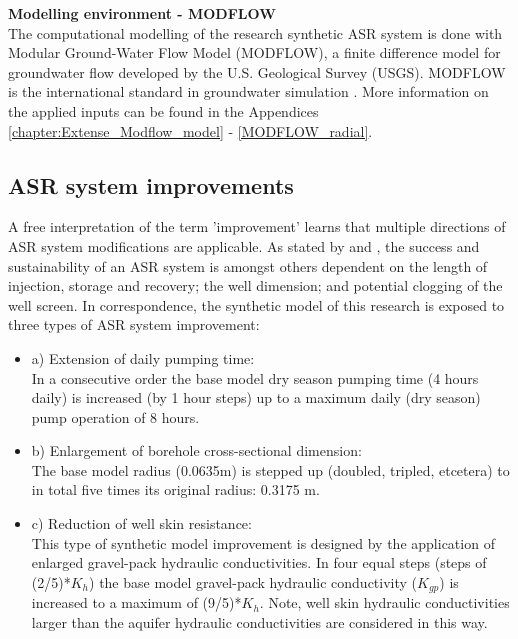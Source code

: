
\textbf{Modelling environment - MODFLOW} \\
The computational modelling of the research synthetic ASR system is done with Modular Ground-Water Flow Model (MODFLOW), a finite difference model for groundwater flow developed by the U.S. Geological Survey (USGS). MODFLOW is the international standard in groundwater simulation \citep{Niswonger2011,HarbaughArlen2005}. More information on the applied inputs can be found in the Appendices \ref{chapter:Extense_Modflow_model} - \ref{MODFLOW_radial}.


\subsection{ASR system improvements}
\label{subsec:improvements}
A free interpretation of the term 'improvement' learns that multiple directions of ASR system modifications are applicable. As stated by \citet{Bakker2010} and \citet{Ward2007}, the success and sustainability of an ASR system is amongst others dependent on the length of injection, storage and recovery; the well dimension; and potential clogging of the well screen. In correspondence, the synthetic model of this research is exposed to three types of ASR system improvement:

\begin{itemize}
\item{a) Extension of daily pumping time:} \\
In a consecutive order the base model dry season pumping time (4 hours daily) is increased (by 1 hour steps) up to a maximum daily (dry season) pump operation of 8 hours.
\item{b) Enlargement of borehole cross-sectional dimension:} \\
The base model radius (0.0635m) is stepped up (doubled, tripled, etcetera) to in total five times its original radius: 0.3175 m. 
\item{c) Reduction of well skin resistance:} \\
This type of synthetic model improvement is designed by the application of enlarged gravel-pack hydraulic conductivities. In four equal steps (steps of (2/5)*$K_{h}$) the base model gravel-pack hydraulic conductivity ($K_{gp}$) is increased to a maximum of (9/5)*$K_{h}$. Note, well skin hydraulic conductivities larger than the aquifer hydraulic conductivities are considered in this way.
\end{itemize}


